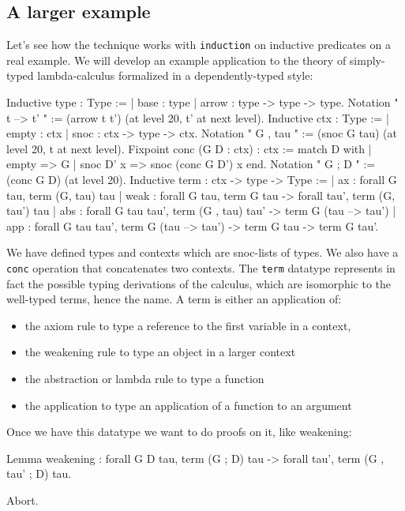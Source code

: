 \begin{coq_example*}
\subsection{A larger example}

Let's see how the technique works with {\tt induction} on inductive
predicates on a real example. We will develop an example application to the
theory of simply-typed lambda-calculus formalized in a dependently-typed style:

\begin{coq_example*}
Inductive type : Type :=
| base : type
| arrow : type -> type -> type.
Notation " t --> t' " := (arrow t t') (at level 20, t' at next level).
Inductive ctx : Type :=
| empty : ctx
| snoc : ctx -> type -> ctx.
Notation " G , tau " := (snoc G tau) (at level 20, t at next level).
Fixpoint conc (G D : ctx) : ctx :=
  match D with
    | empty => G
    | snoc D' x => snoc (conc G D') x
  end.
Notation " G ; D " := (conc G D) (at level 20).
Inductive term : ctx -> type -> Type :=
| ax : forall G tau, term (G, tau) tau
| weak : forall G tau, 
  term G tau -> forall tau', term (G, tau') tau
| abs : forall G tau tau', 
  term (G , tau) tau' -> term G (tau --> tau')
| app : forall G tau tau', 
  term G (tau --> tau') -> term G tau -> term G tau'.
\end{coq_example*}

We have defined types and contexts which are snoc-lists of types. We
also have a {\tt conc} operation that concatenates two contexts.
The {\tt term} datatype represents in fact the possible typing
derivations of the calculus, which are isomorphic to the well-typed
terms, hence the name. A term is either an application of:
\begin{itemize}
\item the axiom rule to type a reference to the first variable in a context,
\item the weakening rule to type an object in a larger context
\item the abstraction or lambda rule to type a function
\item the application to type an application of a function to an argument
\end{itemize}

Once we have this datatype we want to do proofs on it, like weakening:

\begin{coq_example*}
Lemma weakening : forall G D tau, term (G ; D) tau -> 
  forall tau', term (G , tau' ; D) tau.
\end{coq_example*}
\begin{coq_eval}
  Abort.
\end{coq_eval}


\end{coq_example*}
